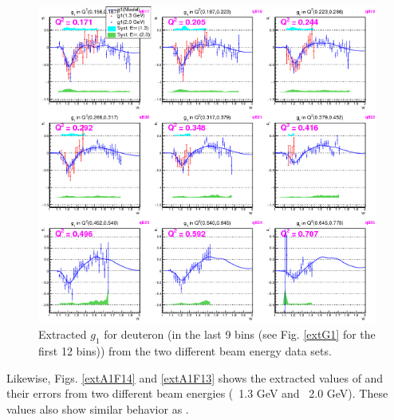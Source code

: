 \begin{figure}[H] %
  \leavevmode \includegraphics[width=1.0\textwidth]{figuresEG4/FigResults/extractedFrmBothEb_G1_C71S181NoQeWbins70LessQ2binsNwPd3.png} 
  \caption[Extracted $g_{1}$ in the next 9 \qsqs bins]{Extracted $g_{1}$ for deuteron (in the last 9 \qsqs bins (see Fig. \ref{extG1} for the first 12 bins)) from the two different beam energy data sets.}
  \label{extG13}  %
\end{figure}


Likewise, Figs. \ref{extA1F14} and \ref{extA1F13} shows the extracted values of \afones and their errors from two different beam energies (~1.3 GeV and ~2.0 GeV). %
These values also show similar behavior as \gone. %

